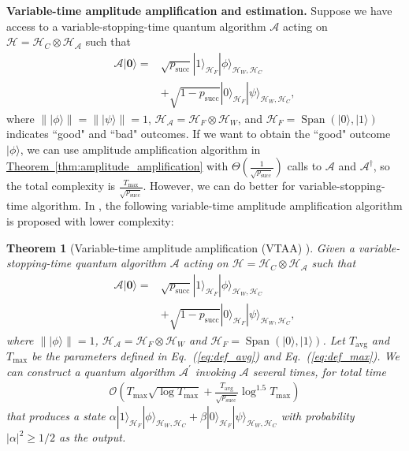 \documentclass[journal]{IEEEtran}
\newtheorem{theorem}{Theorem}
\newcommand{\eq}[1]{Eq.~(\ref{eq:#1})}
\newcommand{\thm}[1]{\hyperref[thm:#1]{Theorem~\ref*{thm:#1}}}
\DeclareMathOperator{\spn}{Span}
\begin{document}
\vspace{3mm}
\noindent
\textbf{Variable-time amplitude amplification and estimation.}
Suppose we have access to a variable-stopping-time quantum algorithm $\mathcal{A}$ acting on $\mathcal{H} = \mathcal{H}_C\otimes \mathcal{H}_{\mathcal{A}} $ such that
\begin{align}
    \mathcal{A}|\mathbf{0}\rangle=&\sqrt{p_{\text{succ}}}|1\rangle_{\mathcal{H}_F}|\phi\rangle_{\mathcal{H}_W,\mathcal{H}_C}\nonumber\\&+\sqrt{1-p_{\text{succ}}}|0\rangle_{\mathcal{H}_F}|\psi\rangle_{\mathcal{H}_W,\mathcal{H}_C},
\end{align}
where $\||\phi\rangle \| = \||\psi\rangle \|= 1$, $\mathcal{H}_{\mathcal{A}} = \mathcal{H}_{F}\otimes \mathcal{H}_{W}$, and $\mathcal{H}_F = \spn(|0\rangle,|1\rangle)$ indicates ``good" and ``bad" outcomes. If we want to obtain the ``good" outcome $|\phi\rangle$, we can use amplitude amplification algorithm in \thm{amplitude_amplification} with $\Theta(\frac{1}{\sqrt{p_{\text{succ}}}})$ calls to $\mathcal{A}$ and $\mathcal{A}^{\dagger}$, so the total complexity is $\frac{T_{\max}}{\sqrt{p_{\text{succ}}}}$. However, we can do better for variable-stopping-time algorithm. In \cite{ambainis2012variable}, the following variable-time amplitude amplification algorithm is proposed with lower complexity:
\begin{theorem}[Variable-time amplitude amplification (VTAA) {\cite[Theorem 1]{ambainis2012variable}}]
      Given a variable-stopping-time quantum algorithm $\mathcal{A}$ acting on $\mathcal{H} = \mathcal{H}_C\otimes \mathcal{H}_{\mathcal{A}} $ such that
    \begin{align}
        \mathcal{A}|\mathbf{0}\rangle=&\sqrt{p_{\mathrm{succ}}}|1\rangle_{\mathcal{H}_F}|\phi\rangle_{\mathcal{H}_W,\mathcal{H}_C}\nonumber \\&+\sqrt{1-p_{\mathrm{succ}}}|0\rangle_{\mathcal{H}_F}|\psi\rangle_{\mathcal{H}_W,\mathcal{H}_C},
    \end{align}
    where $\||\phi\rangle \|=1$, $\mathcal{H}_{\mathcal{A}} = \mathcal{H}_{F}\otimes \mathcal{H}_{W}$ and $\mathcal{H}_F = \spn(|0\rangle,|1\rangle)$. Let $T_{\mathrm{avg}}$ and $T_{\max}$ be the parameters defined in \eq{def_avg} and \eq{def_max}. We can construct a quantum algorithm $\mathcal{A}^{\prime}$ invoking $\mathcal{A}$ several times, for total time
    \begin{align}
    \mathcal{O}\left(T_{\max } \sqrt{\log T_{\max }}+\frac{T_{\mathrm{avg}}}{\sqrt{p_{\mathrm{succ }}}} \log ^{1.5} T_{\max }\right)
    \end{align}
    that produces a state $\alpha|1\rangle_{\mathcal{H}_F}|\phi\rangle_{\mathcal{H}_W,\mathcal{H}_C}+\beta|0\rangle_{\mathcal{H}_F}|\psi\rangle_{\mathcal{H}_W,\mathcal{H}_C}$ with probability $|\alpha|^{2} \geq 1 / 2$ as the output.
\end{theorem}
\end{document}
